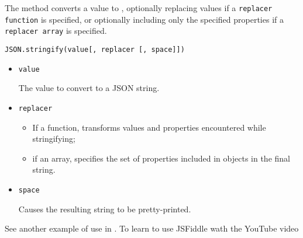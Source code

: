 \label{parrafo:jsonstringify}
The
method converts a value to , optionally replacing values
if a \verb|replacer function| is specified, or optionally including only the
specified properties if a \verb|replacer array| is specified.

\verb|JSON.stringify(value[, replacer [, space]])|
\begin{itemize}
\item
\verb|value|

The value to convert to a JSON string.
\item
\verb|replacer|

  \begin{itemize}
  \item
  If a function, transforms values and properties encountered while stringifying; 
  \item
  if an array, specifies the set of properties included in objects in the final string.
  \end{itemize}

\item
\verb|space|

Causes the resulting string to be pretty-printed.
\end{itemize}


See another example of use in
.
To learn to use JSFiddle wath the YouTube video 


